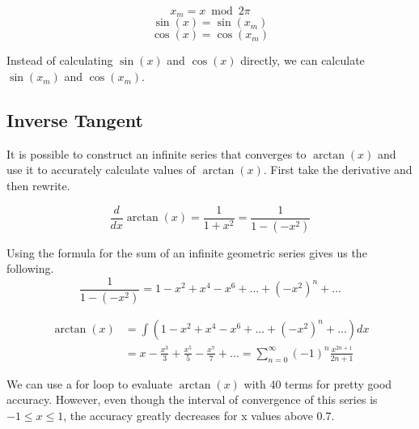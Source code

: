 \documentclass[12pt, letterpaper]{article}
\begin{document}
\[ x_m = x \bmod{2\pi} \]
\[ \sin(x) = \sin(x_m) \]
\[ \cos(x) = \cos(x_m) \]

Instead of calculating $\sin(x)$ and $\cos(x)$ directly, we can calculate $\sin(x_m)$ and $\cos(x_m)$.

\subsection{Inverse Tangent}
It is possible to construct an infinite series that converges to $\arctan(x)$ and use it to accurately calculate values of $\arctan(x)$. First take the derivative and then rewrite.

\[ \frac{d}{dx} \arctan(x) = \frac{1}{1 + x^2} = \frac{1}{1 - (-x^2)}\]

Using the formula for the sum of an infinite geometric series gives us the following.
\[ \frac{1}{1 - (-x^2)} = 1 - x^2 + x^4 - x^6 + ... + (-x^2)^n + ... \]

\begin{align*}
  \arctan(x) &= \int \left(1 - x^2 + x^4 - x^6 + ... + (-x^2)^n + ...\right)dx \\ 
  &= x - \frac{x^3}{3} + \frac{x^5}{5} - \frac{x^7}{7} + ... = \sum_{n=0}^{\infty}\left(-1\right)^{n}\frac{x^{2n+1}}{2n+1}
\end{align*}

We can use a for loop to evaluate $\arctan(x)$ with 40 terms for pretty good accuracy. However, even though the interval of convergence of this series is $-1 \leq x \leq 1$, the accuracy greatly decreases for x values above 0.7.

\end{document}
